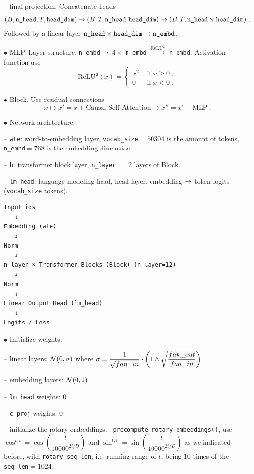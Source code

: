\documentclass[a4paper,11pt]{article}
\numberwithin{equation}{section}
\begin{document}
-- final projection. Concatenate heads $$(B,\verb#n_head#, T, \verb#head_dim#)\ra (B, T, \verb#n_head#, \verb#head_dim#)\ra (B, T, \verb#n_head#\times \verb#head_dim#) \ .$$ Followed by a linear layer $\verb#n_head#\times \verb#head_dim# \ra \verb#n_embd#$.

$\bullet$ MLP. Layer structure: \verb#n_embd# $\rightarrow$ $4\times$ \verb#n_embd# $\stackrel{\text{ReLU}^2}{\longrightarrow}$ \verb#n_embd#. Activation function use $$\text{ReLU}^2(x)=\left\{\begin{array}{ll}
x^2 & \text{ if } x\geq 0 \ , 
\\
0 & \text{ if } x<0 \ .
\end{array}
\right.$$

$\bullet$ Block. Use residual connections $$x\mapsto x'=x+\text{Causal Self-Attention}\mapsto x'' = x'+\text{MLP} \ .$$


$\bullet$ Network architecture: 

-- \verb#wte#: word-to-embedding layer, \verb#vocab_size#$=50304$ is the amount of tokens, \verb#n_embd#$=768$ is the embedding dimension.

-- \verb#h#: transformer block layer, \verb#n_layer#$=12$ layers of Block.

-- \verb#lm_head#: language modeling head, head layer, embedding $\rightarrow$ token logits (\verb#vocab_size# tokens).

\begin{verbatim}
Input ids
   ↓
Embedding (wte)
   ↓
Norm
   ↓
n_layer × Transformer Blocks (Block) (n_layer=12)
   ↓
Norm
   ↓
Linear Output Head (lm_head)
   ↓
Logits / Loss
\end{verbatim}

$\bullet$ Initialize weights:

-- linear layers: $\mathcal{N}(0, \sigma)$ where $\sigma=\dfrac{1}{\sqrt{fan\_in}}\cdot \left(1\wedge \sqrt{\dfrac{fan\_out}{fan\_in}}\right)$

-- embedding layers: $\mathcal{N}(0,1)$

-- \verb#lm_head# weights: 0

-- \verb#c_proj# weights: 0

-- initialize the rotary embeddings: \verb#_precompute_rotary_embeddings()#, use $\cos^{t,i}=\cos \left(\dfrac{t}{10000^{2i/D}}\right)$ and $\sin^{t,i}=\sin \left(\dfrac{t}{10000^{2i/D}}\right)$ as we indicated before, with \verb#rotary_seq_len#, i.e. running range of $t$, being $10$ times of the \verb#seq_len#$=1024$.
\end{document}
